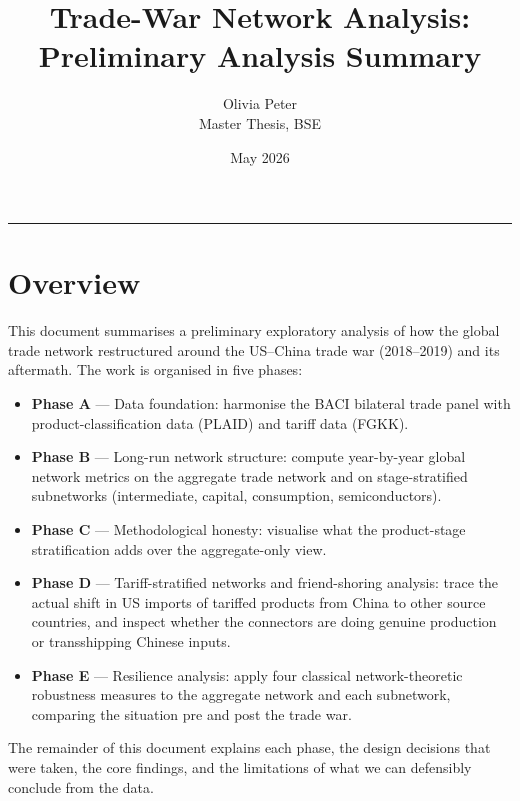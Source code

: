 \documentclass[11pt,a4paper]{article}
\title{\textbf{Trade-War Network Analysis:\\Preliminary Analysis Summary}}
\author{Olivia Peter \\ \small{Master Thesis, BSE}}
\date{May 2026}
\begin{document}
\maketitle
\tableofcontents
\vspace{1em}\hrule\vspace{1em}

\section{Overview}

This document summarises a preliminary exploratory analysis of how the global
trade network restructured around the US--China trade war (2018--2019) and
its aftermath. The work is organised in five phases:

\begin{itemize}[leftmargin=*]
  \item \textbf{Phase A} — Data foundation: harmonise the BACI bilateral trade
        panel with product-classification data (PLAID) and tariff data (FGKK).
  \item \textbf{Phase B} — Long-run network structure: compute year-by-year
        global network metrics on the aggregate trade network and on
        stage-stratified subnetworks (intermediate, capital, consumption,
        semiconductors).
  \item \textbf{Phase C} — Methodological honesty: visualise what the
        product-stage stratification adds over the aggregate-only view.
  \item \textbf{Phase D} — Tariff-stratified networks and friend-shoring
        analysis: trace the actual shift in US imports of tariffed products
        from China to other source countries, and inspect whether the
        connectors are doing genuine production or transshipping Chinese
        inputs.
  \item \textbf{Phase E} — Resilience analysis: apply four classical
        network-theoretic robustness measures to the aggregate network and
        each subnetwork, comparing the situation pre and post the trade war.
\end{itemize}

The remainder of this document explains each phase, the design decisions
that were taken, the core findings, and the limitations of what we can
defensibly conclude from the data.

\end{document}
